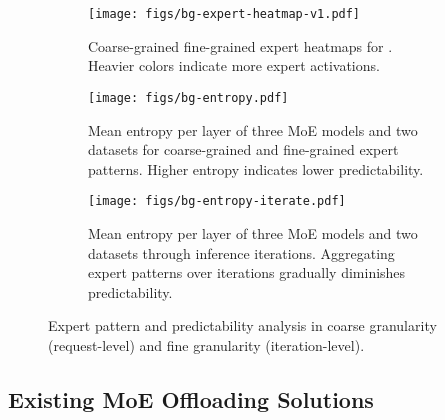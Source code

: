 \begin{figure*}[t]
    \centering
    \begin{subfigure}[t]{0.31\textwidth}
        \centering
        \texttt{[image: figs/bg-expert-heatmap-v1.pdf]}
        \caption{Coarse-grained \vs fine-grained expert heatmaps for \mixtral. Heavier colors indicate more expert activations.}
        \label{fig:bg-expert-heatmap}
    \end{subfigure}
    \hspace{0.02in}
    \begin{subfigure}[t]{0.33\textwidth}
        \centering
        \texttt{[image: figs/bg-entropy.pdf]}
        \caption{Mean entropy per layer of three MoE models and two datasets for coarse-grained and fine-grained expert patterns. Higher entropy indicates lower predictability.}
        \label{fig:bg-entropy}
    \end{subfigure}
    \hspace{0.02in}
    \begin{subfigure}[t]{0.33\textwidth}
        \centering
        \texttt{[image: figs/bg-entropy-iterate.pdf]}
        \caption{Mean entropy per layer of three MoE models and two datasets through inference iterations. Aggregating expert patterns over iterations gradually diminishes predictability.}
        \label{fig:bg-entropy-iterate.pdf}
    \end{subfigure}
    \caption{Expert pattern and predictability analysis in coarse granularity (request-level) and fine granularity (iteration-level).}
    \label{fig:bg-expert-pattern-analysis}
\end{figure*}


\subsection{Existing MoE Offloading Solutions}





